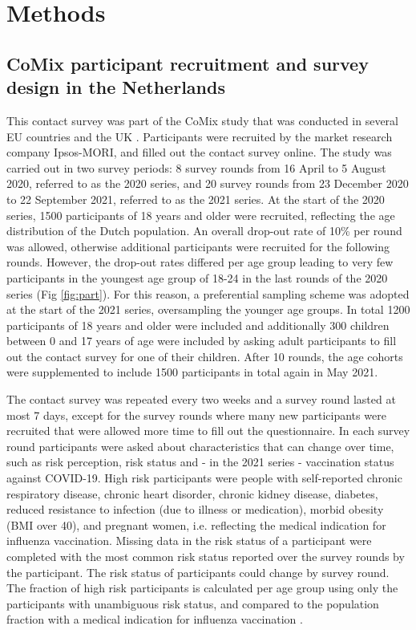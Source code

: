 \documentclass[fleqn,10pt]{wlscirep}
\begin{document}
\section*{Methods}

\subsection*{CoMix participant recruitment and survey design in the Netherlands}

This contact survey was part of the CoMix study that was conducted in several EU countries and the UK \cite{Verelst_2021}. Participants were recruited by the market research company Ipsos-MORI, and filled out the contact survey online. The study was carried out in two survey periods: 8 survey rounds from 16 April to 5 August 2020, referred to as the 2020 series, and 20 survey rounds from 23 December 2020 to 22 September 2021, referred to as the 2021 series. At the start of the 2020 series, 1500 participants of 18 years and older were recruited, reflecting the age distribution of the Dutch population. An overall drop-out rate of 10\% per round was allowed, otherwise additional participants were recruited for the following rounds. However, the drop-out rates differed per age group leading to very few participants in the youngest age group of 18-24 in the last rounds of the 2020 series (Fig \ref{fig:part}). For this reason, a preferential sampling scheme was adopted at the start of the 2021 series, oversampling the younger age groups. In total 1200 participants of 18 years and older were included and additionally 300 children between 0 and 17 years of age were included by asking adult participants to fill out the contact survey for one of their children. After 10 rounds, the age cohorts were supplemented to include 1500 participants in total again in May 2021.

The contact survey was repeated every two weeks and a survey round lasted at most 7 days, except for the survey rounds where many new participants were recruited that were allowed more time to fill out the questionnaire. In each survey round participants were asked about characteristics that can change over time, such as risk perception, risk status and - in the 2021 series - vaccination status against COVID-19. High risk participants were people with self-reported chronic respiratory disease, chronic heart disorder, chronic kidney disease, diabetes, reduced resistance to infection (due to illness or medication), morbid obesity (BMI over 40), and pregnant women, i.e. reflecting the medical indication for influenza vaccination. Missing data in the risk status of a participant were completed with the most common risk status reported over the survey rounds by the participant. The risk status of participants could change by survey round. The fraction of high risk participants is calculated per age group using only the participants with unambiguous risk status, and compared to the population fraction with a medical indication for influenza vaccination \cite{Nivel_2021}. 
\end{document}
